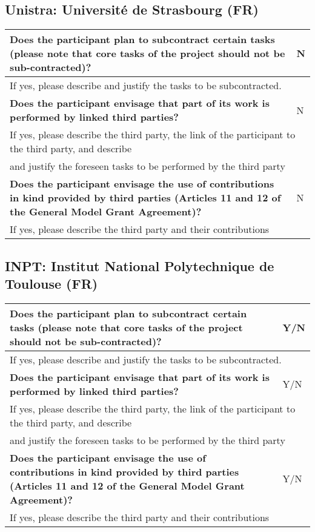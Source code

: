 \subsection{Unistra: Université de Strasbourg (FR)}

\begin{longtable}{|p{}|p{}|}
\hline
{\bf Does the participant plan to subcontract certain tasks (please
  note that core tasks of the project should not be sub-contracted)?}
&
N
\\
\hline
\multicolumn{2}{|l|}{
If yes, please describe and justify the tasks to be subcontracted.}
\\
\hline
{\bf Does the participant envisage that  part of its work is performed
  by linked third parties?}
&
N
\\
\hline
\multicolumn{2}{|l|}{If yes, please describe the third party, the link of the
  participant to the third party, and describe}\\
\multicolumn{2}{|l|}{and justify the foreseen
tasks to be performed by the third party}
\\
\hline
{\bf Does the participant envisage the use of contributions in kind
provided by third parties (Articles 11 and 12 of the General Model
Grant Agreement)?}
&
N
\\
\hline
\multicolumn{2}{|l|}{If yes, please describe the third party and their contributions}
\\
\hline
\end{longtable}


\subsection{INPT: Institut National Polytechnique de Toulouse (FR)}

\begin{longtable}{|p{}|p{}|}
\hline
{\bf Does the participant plan to subcontract certain tasks (please
  note that core tasks of the project should not be sub-contracted)?}
&
Y/N
\\
\hline
\multicolumn{2}{|l|}{
If yes, please describe and justify the tasks to be subcontracted.}
\\
\hline
{\bf Does the participant envisage that  part of its work is performed
  by linked third parties?}
&
Y/N
\\
\hline
\multicolumn{2}{|l|}{If yes, please describe the third party, the link of the
  participant to the third party, and describe}\\
\multicolumn{2}{|l|}{and justify the foreseen
tasks to be performed by the third party}
\\
\hline
{\bf Does the participant envisage the use of contributions in kind
provided by third parties (Articles 11 and 12 of the General Model
Grant Agreement)?}
&
Y/N
\\
\hline
\multicolumn{2}{|l|}{If yes, please describe the third party and their contributions}
\\
\hline
\end{longtable}

